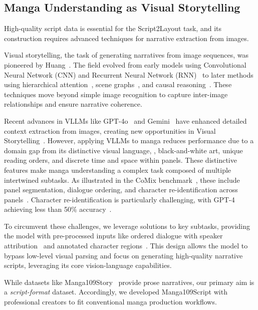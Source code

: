 \subsection{Manga Understanding as Visual Storytelling}
High-quality script data is essential for the Script2Layout task, and its construction requires advanced techniques for narrative extraction from images.

Visual storytelling, the task of generating narratives from image sequences, was pioneered by Huang~\cite{huang_visual_2016}. The field evolved from early models using Convolutional Neural Network (CNN) and Recurrent Neural Network (RNN)~\cite{yu2017hierarchicallyattentivernnalbumsummarization} to later methods using hierarchical attention~\cite{nahian_hierarchical_2019}, scene graphs~\cite{wang_storytelling_scenegraphs2020}, and causal reasoning~\cite{song2024causalstorylocalcausalattention}. These techniques move beyond simple image recognition to capture inter-image relationships and ensure narrative coherence.

Recent advances in VLLMs like GPT-4o~\cite{wu_gpt-4o_2024} and Gemini~\cite{team_gemini_2024} have enhanced detailed context extraction from images, creating new opportunities in Visual Storytelling~\cite{yang_storyllava_2025}.
However, applying VLLMs to manga reduces performance due to a domain gap from its distinctive visual language, \eg, black-and-white art, unique reading orders, and discrete time and space within panels.
These distinctive features make manga understanding a complex task composed of multiple intertwined subtasks. As illustrated in the CoMix benchmark~\cite{vivoli_comicspap_2025}, these include panel segmentation, dialogue ordering, and character re-identification across panels~\cite{sachdeva_manga_2024}. Character re-identification is particularly challenging, with GPT-4 achieving less than 50\% accuracy~\cite{vivoli_comicspap_2025}.

To circumvent these challenges, we leverage solutions to key subtasks, providing the model with pre-processed inputs like ordered dialogue with speaker attribution~\cite{li_manga109dialog_2024} and annotated character regions~\cite{shtedritski_what_2023}. This design allows the model to bypass low-level visual parsing and focus on generating high-quality narrative scripts, leveraging its core vision-language capabilities.

While datasets like Manga109Story~\cite{chen_manga_2024} provide prose narratives, our primary aim is a {\it script-format} dataset. Accordingly, we developed Manga109Script with professional creators to fit conventional manga production workflows.